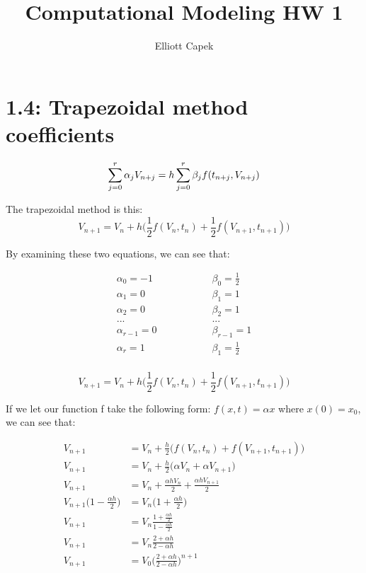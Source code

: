 \documentclass[10pt]{article} %
\title{Computational Modeling HW 1}
\author{Elliott Capek}
\begin{document}
\maketitle{}

\section{1.4: Trapezoidal method coefficients}
\begin{equation}
  \sum_{j=0}^r \alpha_jV_{n+j} = h \sum_{j=0}^r \beta_j f(t_{n+j}, V_{n+j})\\
\end{equation}

The trapezoidal method is this:\\
\begin{equation}
  V_{n+1} = V_n + h\Big( \frac{1}{2}f(V_n, t_n) + \frac{1}{2}f(V_{n+1}, t_{n+1}) \Big)
\end{equation}

By examining these two equations, we can see that:

\begin{align}
  \alpha_0 = -1 &\hspace{2cm} \beta_0 = \frac{1}{2}\\
  \alpha_1 = 0 &\hspace{2cm} \beta_1 = 1\\
  \alpha_2 = 0 &\hspace{2cm} \beta_2 = 1\\
  ...  &\hspace{2cm} ...\\
  \alpha_{r-1} = 0 &\hspace{2cm} \beta_{r-1} = 1\\
  \alpha_r = 1 &\hspace{2cm} \beta_1 = \frac{1}{2}\\    
\end{align}

\begin{equation}
  V_{n+1} = V_n + h\Big( \frac{1}{2}f(V_n, t_n) + \frac{1}{2}f(V_{n+1}, t_{n+1}) \Big)
\end{equation}

If we let our function f take the following form: $f(x, t) = \alpha x$ where $x(0) = x_0$, we can see that:

\begin{align}
  V_{n+1} &= V_n + \frac{h}{2}\Big( f(V_n, t_n) + f(V_{n+1}, t_{n+1}) \Big)\\
  V_{n+1} &= V_n + \frac{h}{2}\Big( \alpha V_n + \alpha V_{n+1} \Big)\\
  V_{n+1} &= V_n + \frac{\alpha hV_n}{2} + \frac{\alpha hV_{n+1}}{2}\\
  V_{n+1} \Big(1 - \frac{\alpha h}{2}\Big) &= V_n \Big(1 + \frac{\alpha h}{2}\Big) \\
  V_{n+1} &= V_n \frac{1 + \frac{\alpha h}{2}}{1 - \frac{\alpha h}{2}} \\
  V_{n+1} &= V_n \frac{2 + \alpha h}{2 - \alpha h} \\
  V_{n+1} &= V_0 \Big(\frac{2 + \alpha h}{2 - \alpha h}\Big)^{n+1} \\    
\end{align}
\end{document}
